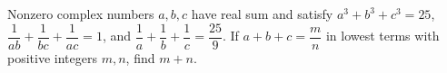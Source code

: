 Nonzero complex numbers $a,b,c$ have real sum and satisfy $a^3+b^3+c^3=25$, $\dfrac{1}{ab}+\dfrac{1}{bc}+\dfrac{1}{ac}=1$, and $\dfrac{1}{a}+\dfrac{1}{b}+\dfrac{1}{c}=\dfrac{25}{9}$. If $a+b+c=\dfrac{m}{n}$ in lowest terms with positive integers $m,n$, find $m+n$.
